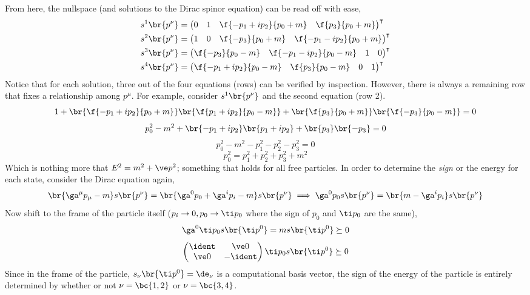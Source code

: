 \documentclass{article}
\begin{document}
From here, the nullspace (and solutions to the Dirac spinor equation) can be read off with ease,
\begin{align*}
    s^{1}\br{p^{\nu}} &= \begin{pmatrix} 0 & 1 & \f{-p_1 + i p_2}{p_0 + m} & \f{p_3}{p_0 + m} \end{pmatrix}^{\intercal} \\
    s^{2}\br{p^{\nu}} &= \begin{pmatrix} 1 & 0 & \f{-p_3}{p_0 + m} & \f{-p_1 - i p_2}{p_0 + m} \end{pmatrix}^{\intercal} \\
    s^{3}\br{p^{\nu}} &= \begin{pmatrix} \f{-p_3}{p_0 - m} & \f{-p_1 - i p_2}{p_0 - m} & 1 & 0 \end{pmatrix}^{\intercal} \\
    s^{4}\br{p^{\nu}} &= \begin{pmatrix} \f{-p_1 + i p_2}{p_0 - m} & \f{p_3}{p_0 - m} & 0 & 1 \end{pmatrix}^{\intercal}
\end{align*}
Notice that for each solution, three out of the four equations (rows) can be verified by inspection. However, there is always a remaining row that fixes a relationship among $p^{\mu}$. For example, consider $s^{1}\br{p^{\nu}}$ and the second equation (row 2).
\[ 1 + \br{\f{-p_1 + i p_2}{p_0 + m}}\br{\f{p_1 + i p_2}{p_0 - m}} + \br{\f{p_3}{p_0 + m}}\br{\f{-p_3}{p_0 - m}} = 0 \]
\[ p_0^2 - m^2 + \br{-p_1 + i p_2}\br{p_1 + i p_2} + \br{p_3}\br{-p_3} = 0 \]
\[ p_0^2 - m^2 - p_1^2 - p_2^2 - p_3^2 = 0 \]
\[ p_0^2 = p_1^2 + p_2^2 + p_3^2 + m^2 \]
Which is nothing more that $E^{2} = m^2 + \ve p^2$; something that holds for all free particles. In order to determine the \textit{sign} or the energy for each state, consider the Dirac equation again,
\[ \br{\ga^{\mu} p_{\mu} - m}s\br{p^{\nu}} = \br{\ga^{0} p_{0} + \ga^{i} p_{i} - m}s\br{p^{\nu}} \implies \ga^{0} p_0 s\br{p^{\nu}} = \br{m - \ga^{i} p_i} s\br{p^{\nu}} \]
Now shift to the frame of the particle itself ($p_i \to 0, p_0 \to \ti p_{0}$ where the sign of $p_0$ and $\ti p_0$ are the same),
\[ \ga^{0} \ti p_0 s\br{\ti p^{0}} = m s\br{\ti p^{0}} \succeq 0 \]
\[ \begin{pmatrix}
    \ident & \ve 0 \\
    \ve 0 & - \ident \\
\end{pmatrix} \ti p_0 s\br{\ti p^{0}} \succeq 0 \]
Since in the frame of the particle, $s_{\nu}\br{\ti p^{0}} = \de_{\nu}$ is a computational basis vector, the sign of the energy of the particle is entirely determined by whether or not $\nu = \bc{1, 2}$ or $\nu = \bc{3, 4}$.
\end{document}
